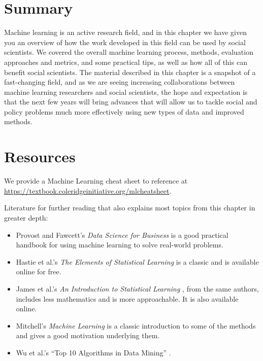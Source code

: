 \documentclass[]{krantz}
\begin{document}
\section{Summary}\label{summary-4}

Machine learning is an active research field, and in this chapter we
have given you an overview of how the work developed in this field can
be used by social scientists. We covered the overall machine learning
process, methods, evaluation approaches and metrics, and some practical
tips, as well as how all of this can benefit social scientists. The
material described in this chapter is a snapshot of a fast-changing
field, and as we are seeing increasing collaborations between machine
learning researchers and social scientists, the hope and expectation is
that the next few years will bring advances that will allow us to tackle
social and policy problems much more effectively using new types of data
and improved methods.

\hypertarget{ml:res}{\section{Resources}\label{ml:res}}

We provide a Machine Learning cheat sheet to reference at
\url{https://textbook.coleridgeinitiative.org/mlcheatsheet}.

Literature for further reading that also explains most topics from this
chapter in greater depth:

\begin{itemize}
\item
  Provost and Fawcett's \emph{Data Science for Business}
  \citep{FawcettProvost} is a good practical handbook for using machine
  learning to solve real-world problems.
\item
  Hastie et al.'s \emph{The Elements of Statistical Learning}
  \citep{HastieTibshirani} is a classic and is available online for
  free.
\item
  James et al.'s \emph{An Introduction to Statistical Learning}
  \citep{james2013introduction}, from the same authors, includes less
  mathematics and is more approachable. It is also available online.
\item
  Mitchell's \emph{Machine Learning} \citep{mitchell1997machine} is a
  classic introduction to some of the methods and gives a good
  motivation underlying them.
\item
  Wu et al.'s ``Top 10 Algorithms in Data Mining'' \citep{wu2008top}.
\end{itemize}
\end{document}
